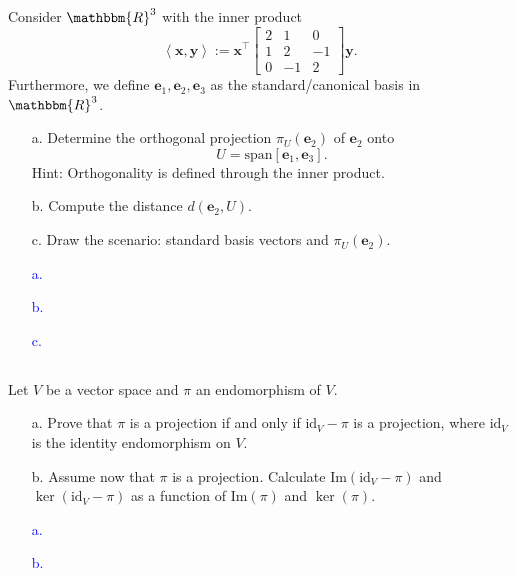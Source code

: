 \documentclass[a4paper,12pt]{article}
\newcommand{\R}{\mathbbm{R}}
\newcommand{\M}[1]{ \begin{bmatrix} #1 \end{bmatrix} }
\newcommand{\vecx}{\textbf{x}}
\newcommand{\vecy}{\textbf{y}}
\newcommand{\vece}{\textbf{e}}
\newcommand{\image}{\textrm{Im}}
\newcommand{\id}{\textrm{id}}
\begin{document}
\subsection{}
Consider $\R^3$ with the inner product
$$\left< \vecx, \vecy \right> := \vecx^\top \M{2&1&0\\1&2&-1\\0&-1&2} \vecy.$$
Furthermore, we define $\vece_1, \vece_2, \vece_3$ as the standard/canonical basis in $\R^3$.
\begin{itemize}
 \item [a.] Determine the orthogonal projection $\pi_U(\vece_2)$ of $\vece_2$ onto
 $$U = \textrm{span}[\vece_1,\vece_3].$$
 Hint: Orthogonality is defined through the inner product.
 \item [b.] Compute the distance $d(\vece_2, U)$.
 \item [c.]Draw the scenario: standard basis vectors and $\pi_U(\vece_2)$.
\end{itemize}
\textcolor{blue}{
\begin{itemize}
 \item [a.] 
 \item [b.] 
 \item [c.] 
\end{itemize}
}
\subsection{}
Let $V$ be a vector space and $\pi$ an endomorphism of $V$.
\begin{itemize}
 \item [a.] Prove that $\pi$ is a projection if and only if $\id_V-\pi$ is a projection, where $\id_V$ is the identity endomorphism on $V$.
 \item [b.] Assume now that $\pi$ is a projection. Calculate $\image(\id_V-\pi)$ and $\ker(\id_V-\pi)$ as a function of $\image(\pi)$ and $\ker(\pi)$.
\end{itemize}
\textcolor{blue}{
\begin{itemize}
 \item [a.] 
 \item [b.] 
\end{itemize}
}
\end{document}
